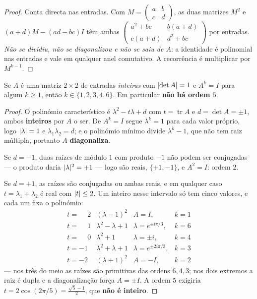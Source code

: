 \documentclass[livro.tex]{subfiles}
\begin{document}
\begin{proof}
Conta directa nas entradas. Com
$M=\left(\begin{smallmatrix}a&b\\c&d\end{smallmatrix}\right)$, as duas matrizes
$M^{2}$ e $(a+d)M-(ad-bc)I$ têm ambas
$\left(\begin{smallmatrix}a^{2}+bc & b(a+d)\\ c(a+d) & d^{2}+bc\end{smallmatrix}\right)$
por entradas. \emph{Não se dividiu, não se diagonalizou e não se saiu de $A$}: a
identidade é polinomial nas entradas e vale em qualquer anel comutativo. A
recorrência é multiplicar por $M^{k-1}$.
\end{proof}

\begin{lema}\label{fis:lem:cristal}Se $A$ é uma matriz $2\times2$ de entradas \emph{inteiras} com $\lvert \det A\rvert=1$ e
$A^{k}=I$ para algum $k\ge1$, então $k\in\{1,2,3,4,6\}$. Em particular
\textbf{não há ordem $5$}.
\end{lema}

\begin{proof}
O polinómio característico é $\lambda^{2}-t\lambda+d$ com $t=\operatorname{tr}A$
e $d=\det A=\pm1$, ambos \textbf{inteiros} por $A$ o ser. De $A^{k}=I$ segue
$\lambda^{k}=1$ para cada valor próprio, logo $\lvert \lambda\rvert=1$ e
$\lambda_{1}\lambda_{2}=d$; e o polinómio mínimo divide $\lambda^{k}-1$, que não
tem raiz múltipla, portanto $A$ \textbf{diagonaliza}.

Se $d=-1$, duas raízes de módulo $1$ com produto $-1$ não podem ser conjugadas
--- o produto daria $\lvert \lambda\rvert^{2}=+1$ --- logo são reais, $\{+1,-1\}$, e
$A^{2}=I$: ordem $2$.

Se $d=+1$, as raízes são conjugadas ou ambas reais, e em qualquer caso
$t=\lambda_{1}+\lambda_{2}$ é real com $\lvert t\rvert\le2$. Um inteiro nesse intervalo
só tem cinco valores, e cada um fixa o polinómio:
\[
\begin{array}{cclr}
t=\phantom{-}2 & (\lambda-1)^{2} & A=I, & k=1\\
t=\phantom{-}1 & \lambda^{2}-\lambda+1 & \lambda=e^{\pm i\pi/3}, & k=6\\
t=\phantom{-}0 & \lambda^{2}+1 & \lambda=\pm i, & k=4\\
t=-1 & \lambda^{2}+\lambda+1 & \lambda=e^{\pm2i\pi/3}, & k=3\\
t=-2 & (\lambda+1)^{2} & A=-I, & k=2
\end{array}
\]
--- nos três do meio as raízes são primitivas das ordens $6,4,3$; nos dois
extremos a raiz é dupla e a diagonalização força $A=\pm I$. A ordem $5$ exigiria
$t=2\cos(2\pi/5)=\tfrac{\sqrt5-1}{2}$, que \textbf{não é inteiro}.
\end{proof}
\end{document}
